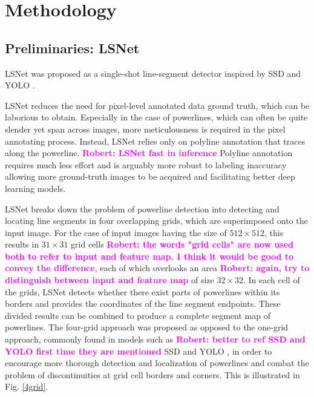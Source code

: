 \documentclass[journal]{IEEEtran}
\newcommand{\commentR}[1]{\textbf{\textcolor{magenta}{Robert: #1}}}
\begin{document}
\section{Methodology}

\subsection{Preliminaries: LSNet}
LSNet \cite{Nguyen2020} was proposed as a single-shot line-segment detector inspired by SSD \cite{SSD} and YOLO \cite{YOLO}. 

LSNet reduces the need for pixel-level annotated data ground truth, which can be laborious to obtain. Especially in the case of powerlines, which can often be quite slender yet span across images, more meticulousness is required in the pixel annotating process. Instead, LSNet relies only on polyline annotation that traces along the powerline. \commentR{LSNet fast in inference} Polyline annotation requires much less effort and is arguably more robust to labeling inaccuracy allowing more ground-truth images to be acquired and facilitating better deep learning models. 

LSNet breaks down the problem of powerline detection into detecting and locating line segments in four overlapping grids, which are superimposed onto the input image. For the case of input images having the size of $512 \times 512$, this results in $31 \times 31$ grid cells \commentR{the words "grid cells" are now used both to refer to input and feature map. I think it would be good to convey the difference}, each of which overlooks an area \commentR{again, try to distinguish between input and feature map} of size $32 \times 32$. In each cell of the grids,  LSNet detects whether there exist parts of powerlines within its borders and provides the coordinates of the line segment endpoints. These divided results can be combined to produce a complete segment map of powerlines. The four-grid approach was proposed as opposed to the one-grid approach, commonly found in models such as \commentR{better to ref SSD and YOLO first time they are mentioned} SSD \cite{SSD} and YOLO \cite{YOLO}, in order to encourage more thorough detection and localization of powerlines and combat the problem of discontinuities at grid cell borders and corners. This is illustrated in Fig. \ref{4grid}. 
\end{document}
